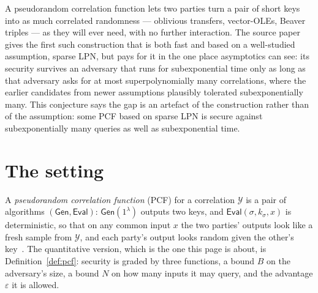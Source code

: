 \documentclass{aicr-conjecture}
\newcommand{\Corr}{\mathcal{Y}}
\newcommand{\Gen}{\mathsf{Gen}}
\newcommand{\Eval}{\mathsf{Eval}}
\begin{document}

\vspace{0.4em}

\begin{informalconjecture}
A pseudorandom correlation function lets two parties turn a pair of
short keys into as much correlated randomness --- oblivious transfers,
vector-OLEs, Beaver triples --- as they will ever need, with no further
interaction. The source paper gives the first such construction that is
both fast and based on a well-studied assumption, sparse LPN, but pays
for it in the one place asymptotics can see: its security survives an
adversary that runs for subexponential time only as long as that
adversary asks for at most superpolynomially many correlations, where
the earlier candidates from newer assumptions plausibly tolerated
subexponentially many. This conjecture says the gap is an artefact of
the construction rather than of the assumption: some PCF based on
sparse LPN is secure against subexponentially many queries as well as
subexponential time.
\end{informalconjecture}

\section{The setting}\label{sec:setting}

A \emph{pseudorandom correlation function} (PCF) for a correlation
$\Corr$ is a pair of algorithms $(\Gen, \Eval)$: $\Gen(1^{\lambda})$
outputs two keys, and $\Eval(\sigma, k_{\sigma}, x)$ is deterministic,
so that on any common input $x$ the two parties' outputs look like a
fresh sample from $\Corr$, and each party's output looks random given
the other's key~\cite{BCGIKS20}. The quantitative version, which is the
one this page is about, is Definition~\ref{def:pcf}: security is graded
by three functions, a bound $B$ on the adversary's size, a bound $N$ on
how many inputs it may query, and the advantage $\varepsilon$ it is
allowed.
\end{document}
